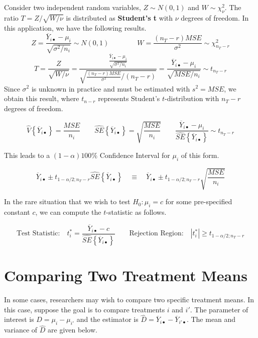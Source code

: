 \documentclass[
]{book}
\begin{document}
Consider two independent random variables, \(Z \sim N(0,1)\) and
\(W\sim \chi_{\nu}^2\). The ratio \(T=Z/\sqrt{W/\nu}\) is distributed as
\textbf{Student's t} with \(\nu\) degrees of freedom. In this
application, we have the following results. \[
Z=\frac{\overline{Y}_{i\bullet}-\mu_i}{\sqrt{\sigma^2/n_i}} \sim N(0,1) \qquad \qquad 
W=\frac{\left(n_T-r\right)MSE}{\sigma^2} \sim \chi_{n_T-r}^2 
\] \[
T=\frac{Z}{\sqrt{W/\nu}}=
\frac{\frac{\overline{Y}_{i\bullet}-\mu_i}{\sqrt{\sigma^2/n_i}}}{
\sqrt{\frac{\left(n_T-r\right)MSE}{\sigma^2}/\left(n_T-r\right)}
}=\frac{\overline{Y}_{i\bullet}-\mu_i}{\sqrt{MSE/n_i}} \sim t_{n_T-r}
\] Since \(\sigma^2\) is unknown in practice and must be estimated with
\(s^2=MSE\), we obtain this result, where \(t_{n-r}\) represents
Student's \(t\)-distribution with \(n_T-r\) degrees of freedom.

\[
\hat{V}\left\{\overline{Y}_{i\bullet}\right\}=\frac{MSE}{n_i} \qquad  
\hat{SE}\left\{\overline{Y}_{i\bullet}\right\}=\sqrt{\frac{MSE}{n_i}}
\qquad
\frac{\overline{Y}_{i\bullet}-\mu_i}{\hat{SE}\left\{\overline{Y}_{i\bullet}\right\}}
\sim t_{n_T-r}
\]

This leads to a \((1-\alpha)100\%\) Confidence Interval for \(\mu_i\) of
this form.

\[\overline{Y}_{i\bullet} \pm t_{1-\alpha/2;n_T-r}\hat{SE}\left\{\overline{Y}_{i\bullet}\right\}
\quad \equiv \quad
\overline{Y}_{i\bullet} \pm t_{1-\alpha/2;n_T-r}\sqrt{\frac{MSE}{n_i}}
\]

In the rare situation that we wish to test \(H_0:\mu_i=c\) for some
pre-specified constant \(c\), we can compute the \(t\)-statistic as
follows.

\[
\mbox{Test Statistic:} \quad t_i^* = \frac{\overline{Y}_{i\bullet}-c}{\hat{SE}\left\{\overline{Y}_{i\bullet}\right\}} \qquad
\mbox{Rejection Region:} \quad \left|t_i^*\right| \ge t_{1-\alpha/2;n_T-r}
\]

\section{Comparing Two Treatment
Means}\label{comparing-two-treatment-means}

In some cases, researchers may wish to compare two specific treatment
means. In this case, suppose the goal is to compare treatments \(i\) and
\(i'\). The parameter of interest is \(D=\mu_i-\mu_{i'}\) and the
estimator is
\(\hat{D}=\overline{Y}_{i\bullet}-\overline{Y}_{i'\bullet}\). The mean
and variance of \(\hat{D}\) are given below.
\end{document}
